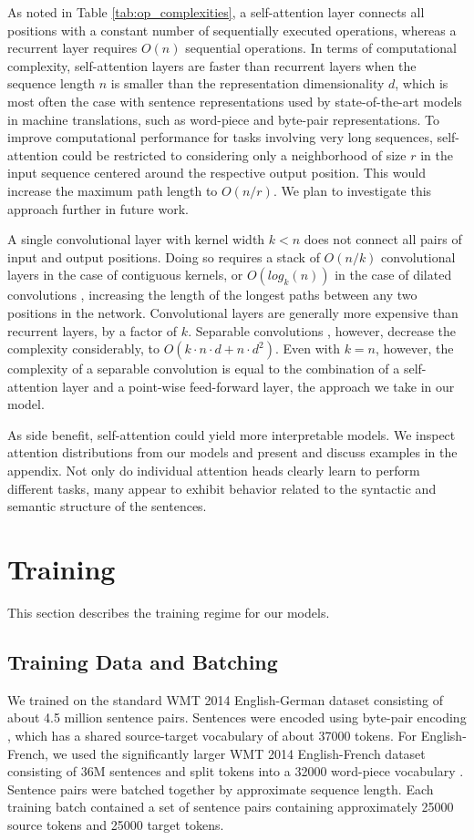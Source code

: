 As noted in Table \ref{tab:op_complexities}, a self-attention layer connects all positions with a constant number of sequentially executed operations, whereas a recurrent layer requires $O(n)$ sequential operations.
In terms of computational complexity, self-attention layers are faster than recurrent layers when the sequence length $n$ is smaller than the representation dimensionality $d$, which is most often the case with sentence representations used by state-of-the-art models in machine translations, such as word-piece \citep{wu2016google} and byte-pair \citep{sennrich2015neural} representations.
To improve computational performance for tasks involving very long sequences, self-attention could be restricted to considering only a neighborhood of size $r$ in the input sequence centered around the respective output position. This would increase the maximum path length to $O(n/r)$. We plan to investigate this approach further in future work.

A single convolutional layer with kernel width $k < n$ does not connect all pairs of input and output positions. Doing so requires a stack of $O(n/k)$ convolutional layers in the case of contiguous kernels, or $O(log_k(n))$ in the case of dilated convolutions \citep{NalBytenet2017}, increasing the length of the longest paths between any two positions in the network.
Convolutional layers are generally more expensive than recurrent layers, by a factor of $k$. Separable convolutions \citep{xception2016}, however, decrease the complexity considerably, to $O(k \cdot n \cdot d + n \cdot d^2)$. Even with $k=n$, however, the complexity of a separable convolution is equal to the combination of a self-attention layer and a point-wise feed-forward layer, the approach we take in our model.

As side benefit, self-attention could yield more interpretable models. We inspect attention distributions from our models and present and discuss examples in the appendix. Not only do individual attention heads clearly learn to perform different tasks, many appear to exhibit behavior related to the syntactic and semantic structure of the sentences.


\section{Training}
This section describes the training regime for our models. 

\subsection{Training Data and Batching}
We trained on the standard WMT 2014 English-German dataset consisting of about 4.5 million sentence pairs.  Sentences were encoded using byte-pair encoding \citep{DBLP:journals/corr/BritzGLL17}, which has a shared source-target vocabulary of about 37000 tokens. For English-French, we used the significantly larger WMT 2014 English-French dataset consisting of 36M sentences and split tokens into a 32000 word-piece vocabulary \citep{wu2016google}.  Sentence pairs were batched together by approximate sequence length.  Each training batch contained a set of sentence pairs containing approximately 25000 source tokens and 25000 target tokens.  

